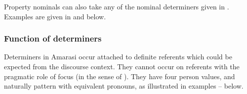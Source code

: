 Property nominals can also take any of the nominal determiners
given in .
Examples are given in  and  below.

\begin{exe}
	\label{ex:120923-1, 12.22}
	\label{ex:120715-4, 0.47}
\end{exe}

\subsubsection{Function of determiners}\label{sec:FunDet}
Determiners in Amarasi occur attached to definite referents
which could be expected from the discourse context.
They cannot occur on referents with the pragmatic role
of focus (in the sense of \citealt[214]{la94}).
They have four person values,
and naturally pattern with equivalent pronouns,
as illustrated in examples -- below.

